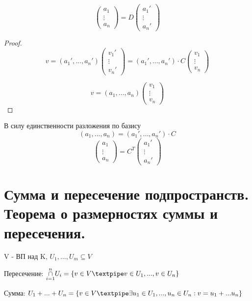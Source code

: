 \documentclass[12pt, fleqn]{article}
\begin{document}
			\begin{theorem} 
					\[\begin{pmatrix}
						a_1\\
						\vdots\\
						a_n
					\end{pmatrix} = D
				   \begin{pmatrix}
				   		a_1'\\
						\vdots\\
						a_n'
				   \end{pmatrix}\]
			\end{theorem}
			\begin{proof}
				\[v = (a_1', ..., a_n') \begin{pmatrix}
					v_1'\\
					\vdots\\
					v_n'
				\end{pmatrix} =
				(a_1', ..., a_n') \cdot C \begin{pmatrix}
					v_1 \\
					\vdots\\
					v_n
				\end{pmatrix} \]

				\[v = (a_1, ..., a_n) \begin{pmatrix}
					v_1\\
					\vdots\\
					v_n
				\end{pmatrix} \]
			\end{proof}
			В силу единственности разложения по базису
			\[(a_1, ..., a_n) = (a_1', ..., a_n') \cdot C  \]
			\[\begin{pmatrix}
				a_1\\
				\vdots\\
				a_n
			\end{pmatrix} = C^T
			\begin{pmatrix}
				a_1'\\
				\vdots\\
				a_n'
			\end{pmatrix}\]


\section{Сумма и пересечение подпространств. Теорема о размерностях суммы и пересечения.}
  \begin{definition}
    V - ВП над K, $U_1,...,U_m \subseteq V$

    Пересечение: $\underset{i=1}{\overset{n}{\cap}} U_i = \{ v \in V \textpipe v \in U_1,...,v \in U_n\}$

    Сумма: $U_1+...+U_n=\{v \in V \textpipe \exists u_1 \in U_1,...,u_n \in U_n: v=u_1+...u_n \}$
  \end{definition}
\end{document}
